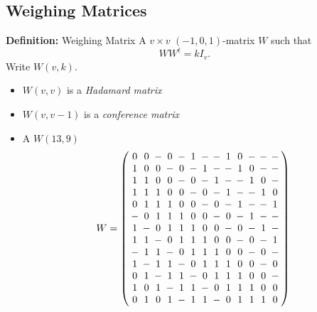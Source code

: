 \documentclass{beamer}
\begin{document}

\subsection{Weighing Matrices}

\begin{frame}

  \begin{block}{{\bf Definition:} Weighing Matrix}
    A $v \times v$ $(-1,0,1)$-matrix $W$ such that
    \[
      WW^t = kI_v.
    \]
    Write $W(v,k)$.
  \end{block}

  \begin{itemize}
  \item $W(v,v)$ is a {\it Hadamard matrix}
  \item $W(v,v-1)$ is a {\it conference matrix}
  \end{itemize}

\end{frame}

\begin{frame}

  \begin{itemize}
  \item A $W(13,9)$
    \[
      W =
      \arraycolsep=2.0pt\def\arraystretch{1.0}
      \left(
        \begin{array}{ccccccccccccc}
          0&0&-&0&-&1&-&-&1&0&-&-&-\\
          1&0&0&-&0&-&1&-&-&1&0&-&-\\
          1&1&0&0&-&0&-&1&-&-&1&0&-\\
          1&1&1&0&0&-&0&-&1&-&-&1&0\\
          0&1&1&1&0&0&-&0&-&1&-&-&1\\
          -&0&1&1&1&0&0&-&0&-&1&-&-\\
          1&-&0&1&1&1&0&0&-&0&-&1&-\\
          1&1&-&0&1&1&1&0&0&-&0&-&1\\
          -&1&1&-&0&1&1&1&0&0&-&0&-\\
          1&-&1&1&-&0&1&1&1&0&0&-&0\\
          0&1&-&1&1&-&0&1&1&1&0&0&-\\
          1&0&1&-&1&1&-&0&1&1&1&0&0\\
          0&1&0&1&-&1&1&-&0&1&1&1&0\\
        \end{array}
      \right)
    \]
  \end{itemize}
  
\end{frame}
\end{document}
